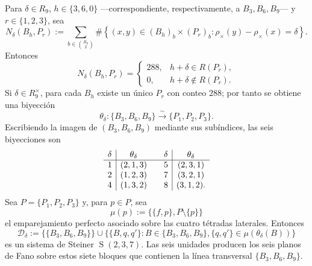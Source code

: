 \begin{theorem}
\label{thm:semillas-seis-fano-fase-rev3}
Para \(\delta\in R_9\), \(h\in\{3,6,0\}\) ---correspondiente,
respectivamente, a \(B_3,B_6,B_9\)--- y \(r\in\{1,2,3\}\), sea
\begin{equation}
 N_\delta(B_h,P_r)
 :=\sum_{b\in\binom{R_9}{2}}
 \#\left\{(x,y)\in(B_h)_b\times(P_r)_b:
 \rho_\times(y)-\rho_\times(x)=\delta\right\}.
 \label{eq:conteo-incidencia-fano-semillas-rev3}
\end{equation}
Entonces
\begin{equation}
 N_\delta(B_h,P_r)=
 \begin{cases}
 288,&h+\delta\in R(P_r),\\
 0,&h+\delta\notin R(P_r).
 \end{cases}
 \label{eq:conteo-288-cero-fano-semillas-rev3}
\end{equation}
Si \(\delta\in R_9^\times\), para cada \(B_h\) existe un único \(P_r\)
con conteo \(288\); por tanto se obtiene una biyección
\[
 \theta_\delta:\{B_3,B_6,B_9\}
 \xrightarrow{\sim}\{P_1,P_2,P_3\}.
\]
Escribiendo la imagen de \((B_3,B_6,B_9)\) mediante sus subíndices, las seis
biyecciones son
\begin{equation}
 \begin{array}{c|c@{\qquad}c|c}
 \delta&\theta_\delta&\delta&\theta_\delta\\
 \hline
 1&(2,1,3)&5&(2,3,1)\\
 2&(1,2,3)&7&(3,2,1)\\
 4&(1,3,2)&8&(3,1,2).
 \end{array}
 \label{eq:tabla-theta-delta-fano-semillas-rev3}
\end{equation}
Sea \(P=\{P_1,P_2,P_3\}\) y, para \(p\in P\), sea
\[
 \mu(p):=\bigl\{\{f,p\},P\setminus\{p\}\bigr\}
\]
el emparejamiento perfecto asociado sobre las cuatro tétradas laterales.
Entonces
\begin{equation}
 \mathcal D_\delta
 :=\bigl\{\{B_3,B_6,B_9\}\bigr\}
 \cup
 \bigl\{\{B,q,q'\}:B\in\{B_3,B_6,B_9\},
       \{q,q'\}\in\mu(\theta_\delta(B))\bigr\}
 \label{eq:sistema-fano-semillas-rev3}
\end{equation}
es un sistema de Steiner \(\operatorname{S}(2,3,7)\). Las seis unidades
producen los seis planos de Fano sobre estos siete bloques que contienen la
línea transversal \(\{B_3,B_6,B_9\}\).
\end{theorem}

